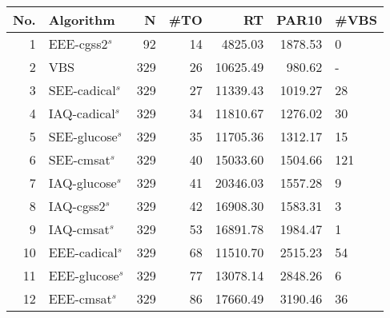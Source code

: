 \begin{tabular}{rlrrrrl}
\toprule
No. & Algorithm & N & #TO & RT & PAR10 & #VBS \\
\midrule
1 & EEE-cgss2$^s$ & 92 & 14 & 4825.03 & 1878.53 & 0 \\
2 & VBS & 329 & 26 & 10625.49 & 980.62 & - \\
3 & SEE-cadical$^s$ & 329 & 27 & 11339.43 & 1019.27 & 28 \\
4 & IAQ-cadical$^s$ & 329 & 34 & 11810.67 & 1276.02 & 30 \\
5 & SEE-glucose$^s$ & 329 & 35 & 11705.36 & 1312.17 & 15 \\
6 & SEE-cmsat$^s$ & 329 & 40 & 15033.60 & 1504.66 & 121 \\
7 & IAQ-glucose$^s$ & 329 & 41 & 20346.03 & 1557.28 & 9 \\
8 & IAQ-cgss2$^s$ & 329 & 42 & 16908.30 & 1583.31 & 3 \\
9 & IAQ-cmsat$^s$ & 329 & 53 & 16891.78 & 1984.47 & 1 \\
10 & EEE-cadical$^s$ & 329 & 68 & 11510.70 & 2515.23 & 54 \\
11 & EEE-glucose$^s$ & 329 & 77 & 13078.14 & 2848.26 & 6 \\
12 & EEE-cmsat$^s$ & 329 & 86 & 17660.49 & 3190.46 & 36 \\
\bottomrule
\end{tabular}
